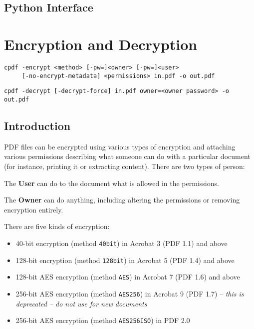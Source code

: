 \documentclass{book}
\begin{document}
\begin{pycpdflib}
\clearpage
\section*{Python Interface}
\begin{small}\tt

\end{small}
\end{pycpdflib}

\chapter{Encryption and Decryption}\label{chap:4}
\pagestyle{fancy}
\label{encryption}
  \begin{framed}
    \small\noindent\verb!cpdf -encrypt <method> [-pw=]<owner> [-pw=]<user>!\\
    \noindent\verb!     [-no-encrypt-metadata] <permissions> in.pdf -o out.pdf!

    \vspace{1.5mm}
    \noindent\verb!cpdf -decrypt [-decrypt-force] in.pdf owner=<owner password> -o out.pdf!
  \end{framed}
  \label{crypt}
  \section{Introduction}
  PDF files can be encrypted using various types of encryption and attaching
various permissions describing what someone can do with a particular document
(for instance, printing it or extracting content). There are two types of
person:
  \begin{description}
    \item The \textbf{User} can do to the document what is allowed in the permissions.
    \item The \textbf{Owner} can do anything, including altering the permissions or removing encryption entirely.
  \end{description}
  There are five kinds of encryption:
  \begin{itemize}
  \item 40-bit encryption (method \texttt{40bit}) in Acrobat 3 (PDF 1.1) and above
  \item 128-bit encryption (method \texttt{128bit}) in Acrobat 5 (PDF 1.4) and above
  \item 128-bit AES encryption (method \texttt{AES}) in Acrobat 7 (PDF 1.6) and above
  \item 256-bit AES encryption (method \texttt{AES256}) in Acrobat 9 (PDF 1.7) -- \textit{this is deprecated -- do not use for new documents}
  \item 256-bit AES encryption (method \texttt{AES256ISO}) in PDF 2.0
  \end{itemize}
\end{document}
